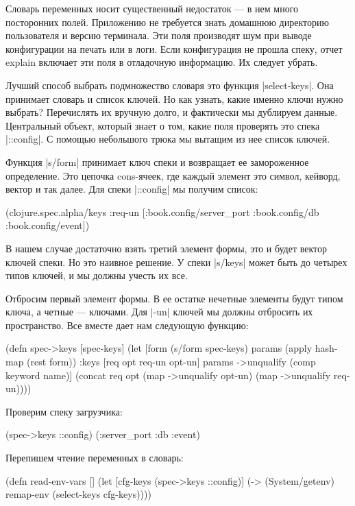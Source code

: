 Словарь переменных носит существенный недостаток — в нем много посторонних
полей. Приложению не требуется знать домашнюю директорию пользователя и версию
терминала. Эти поля производят шум при выводе конфигурации на печать или в
логи. Если конфигурация не прошла спеку, отчет explain включает эти поля в
отладочную информацию. Их следует убрать.

Лучший способ выбрать подмножество словаря это функция \spverb|select-keys|. Она
принимает словарь и список ключей. Но как узнать, какие именно ключи нужно
выбрать? Перечислять их вручную долго, и фактически мы дублируем
данные. Центральный объект, который знает о том, какие поля проверять это спека
\spverb|::config|. С помощью небольшого трюка мы вытащим из нее список ключей.

Функция \spverb|s/form| принимает ключ спеки и возвращает ее замороженное
определение. Это цепочка cons-ячеек, где каждый элемент это символ, кейворд,
вектор и так далее. Для спеки \spverb|::config| мы получим список:

\begin{code}
(clojure.spec.alpha/keys
 :req-un [:book.config/server_port
          :book.config/db
          :book.config/event])
\end{code}

В нашем случае достаточно взять третий элемент формы, это и будет вектор ключей
спеки. Но это наивное решение. У спеки \spverb|s/keys| может быть до четырех типов
ключей, и мы должны учесть их все.

Отбросим первый элемент формы. В ее остатке нечетные элементы будут типом ключа,
а четные — ключами. Для \spverb|-un| ключей мы должны отбросить их пространство. Все
вместе дает нам следующую функцию:

\begin{code}
(defn spec->keys
  [spec-keys]
  (let [form (s/form spec-keys)
        params (apply hash-map (rest form))
        {:keys [req opt req-un opt-un]} params
        ->unqualify (comp keyword name)]
    (concat
     req
     opt
     (map ->unqualify opt-un)
     (map ->unqualify req-un))))
\end{code}

Проверим спеку загрузчика:

\begin{code}
(spec->keys ::config)
(:server_port :db :event)
\end{code}

Перепишем чтение переменных в словарь:

\begin{code}
(defn read-env-vars
  []
  (let [cfg-keys (spec->keys ::config)]
    (-> (System/getenv)
        remap-env
        (select-keys cfg-keys))))
\end{code}

